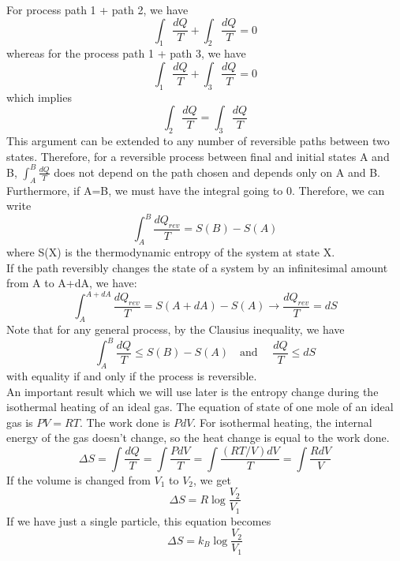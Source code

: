 \documentclass[letterpaper,10pt,english]{article}
\begin{document}
For process path 1 + path 2, we have 
\begin{equation*}
\int_{1} \frac{dQ}{T} + \int_{2} \frac{dQ}{T}=0
\end{equation*}
whereas for the process path 1 + path 3, we have 
\begin{equation*}
\int_{1} \frac{dQ}{T} + \int_{3} \frac{dQ}{T}=0
\end{equation*}
which implies 
\begin{equation*}
\int_{2} \frac{dQ}{T} =\int_{3} \frac{dQ}{T}
\end{equation*}
This argument can be extended to any number of reversible paths between two states. Therefore, for a reversible process between final and initial states A and B, $\int_{A}^{B} \frac{dQ}{T}$ does not depend on the path chosen and depends only on A and B. Furthermore, if A=B, we must have the integral going to 0. Therefore, we can write 
\begin{equation}
\int_{A}^{B} \frac{dQ_{rev}}{T} =S(B)-S(A)
\end{equation}
where S(X) is the thermodynamic entropy of the system at state X. \\
If the path reversibly changes the state of a system by an infinitesimal amount from A to A+dA, we have:
\begin{equation*}
\int_{A}^{A+dA} \frac{dQ_{rev}}{T} =S(A+dA)-S(A) \rightarrow \frac{dQ_{rev}}{T}=dS
\end{equation*}
Note that for any general process, by the Clausius inequality, we have 
\begin{equation*}
\int_{A}^{B} \frac{dQ}{T} \leq S(B)-S(A) \quad \text{and } \quad \frac{dQ}{T} \leq dS
\end{equation*}
with equality if and only if the process is reversible. \\
An important result which we will use later is the entropy change during the isothermal heating of an ideal gas. The equation of state of one mole of an ideal gas is $PV=RT$. The work done is $PdV$. For isothermal heating, the internal energy of the gas doesn't change, so the heat change is equal to the work done. 
\begin{equation*}
\Delta S=\int \frac{dQ}{T}=\int \frac{PdV}{T}=\int \frac {(RT/V) dV}{T}=\int \frac{R dV}{V}
\end{equation*}
If the volume is changed from $V_1$ to $V_2$, we get 
\begin{equation*}
\Delta S=R \log \frac{V_2}{V_1}
\end{equation*}
If we have just a single particle, this equation becomes 
\begin{equation*}
\Delta S=k_B \log \frac{V_2}{V_1}
\end{equation*}
\end{document}
